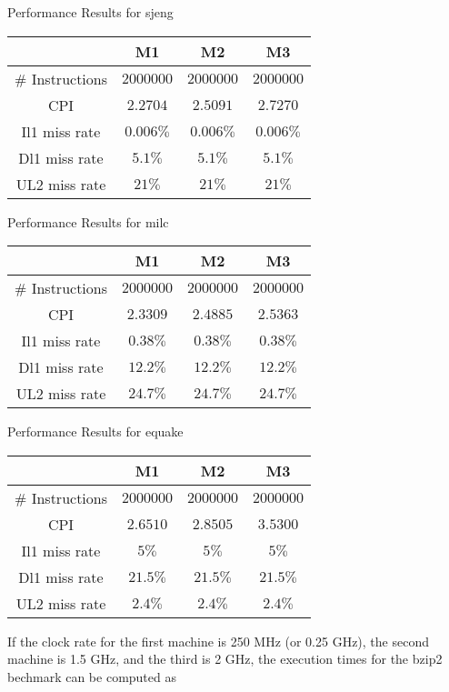 \documentclass[10pt]{article} %
\begin{document}
\begin{enumerate}
\begin{center}
Performance Results for sjeng

\begin{tabular}{|c|c|c|c|}
\hline
 & M1 & M2 & M3 \\
\hline
\# Instructions & $2000000$ & $2000000$ & $2000000$ \\
CPI & $2.2704$ & $2.5091$ & $2.7270$ \\
Il1 miss rate & $0.006\%$ & $0.006\%$ & $0.006\%$ \\
Dl1 miss rate & $5.1\%$ & $5.1\%$ & $5.1\%$ \\
UL2 miss rate & $21\%$ & $21\%$ & $21\%$ \\
\hline
\end{tabular}
\end{center}

\begin{center}
Performance Results for milc

\begin{tabular}{|c|c|c|c|}
\hline
 & M1 & M2 & M3 \\
\hline
\# Instructions & $2000000$ & $2000000$ & $2000000$ \\
CPI & $2.3309$ & $2.4885$ & $2.5363$ \\
Il1 miss rate & $0.38\%$ & $0.38\%$ & $0.38\%$ \\
Dl1 miss rate & $12.2\%$ & $12.2\%$ & $12.2\%$ \\
UL2 miss rate & $24.7\%$ & $24.7\%$ & $24.7\%$ \\
\hline
\end{tabular}
\end{center}

\begin{center}
Performance Results for equake

\begin{tabular}{|c|c|c|c|}
\hline
 & M1 & M2 & M3 \\
\hline
\# Instructions & $2000000$ & $2000000$ & $2000000$ \\
CPI & $2.6510$ & $2.8505$ & $3.5300$ \\
Il1 miss rate & $5\%$ & $5\%$ & $5\%$ \\
Dl1 miss rate & $21.5\%$ & $21.5\%$ & $21.5\%$ \\
UL2 miss rate & $2.4\%$ & $2.4\%$ & $2.4\%$ \\
\hline
\end{tabular}
\end{center}

If the clock rate for the first machine is 250 MHz (or 0.25 GHz), the second machine is 1.5 GHz, and the third is 2 GHz, the execution times for the bzip2 bechmark can be computed as


\end{enumerate}
\end{document}
